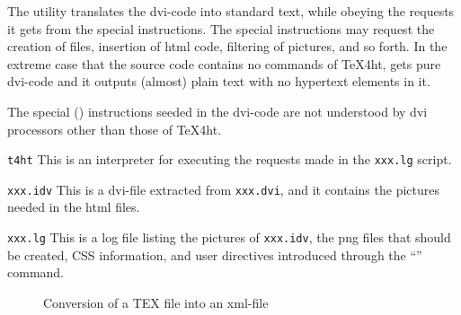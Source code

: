 The utility  translates the dvi-code into standard text, 
while obeying the requests it gets from the special instructions. 
The special instructions may request the creation of files, 
insertion of html code, filtering of pictures, and so forth. 
In the extreme case that the source code contains no commands of TeX4ht, 
 gets pure dvi-code and it outputs (almost) plain text 
with no hypertext elements in it.

The special () 
instructions seeded in the dvi-code 
are not understood by dvi processors other than those of TeX4ht.

\texttt{t4ht}
This is an interpreter 
for executing the requests made in the \texttt{xxx.lg} script.

\texttt{xxx.idv}
This is a dvi-file extracted from \texttt{xxx.dvi}, 
and it contains the pictures needed in the html files.

\texttt{xxx.lg}
This is a log file listing the pictures of \texttt{xxx.idv}, 
the \gls{png} files that should be created, CSS information, 
and user directives introduced 
through the ``'' command.

\raggedbottom{}


\begin{figure}[!htb]
\centering
{}
\caption{\label{fig:tex2xml}Conversion of a TEX file into an xml-file}
\end{figure}

